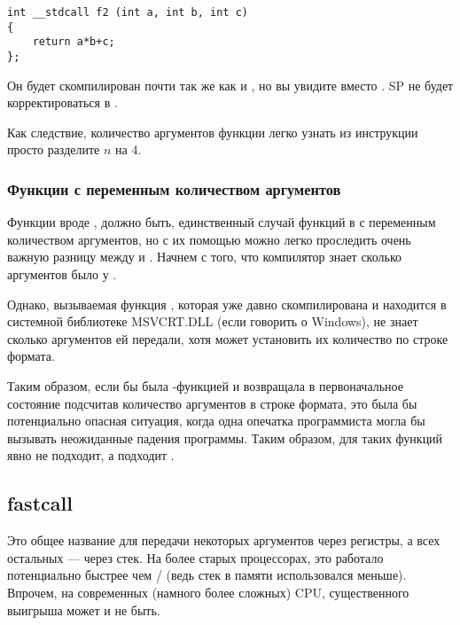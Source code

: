 \begin{lstlisting}
int __stdcall f2 (int a, int b, int c)
{
	return a*b+c;
};
\end{lstlisting}

Он будет скомпилирован почти так же как и ,
но вы увидите  вместо . 
\ac{SP} не будет корректироваться в .

Как следствие, количество аргументов функции легко узнать из инструкции  просто разделите
$n$ на 4.



\subsubsection{Функции с переменным количеством аргументов}

Функции вроде \printf, должно быть, единственный случай функций в \CCpp с переменным количеством аргументов,
но с их помощью можно легко проследить очень важную разницу между  и .
Начнем с того, что компилятор знает сколько аргументов было у \printf.

Однако, вызываемая функция \printf, которая уже давно скомпилирована 
и находится в системной библиотеке MSVCRT.DLL (если говорить о Windows), 
не знает сколько аргументов ей передали, хотя может установить их количество по строке формата.

Таким образом, если бы \printf была -функцией и возвращала  в первоначальное состояние 
подсчитав количество аргументов в строке формата, это была бы потенциально опасная ситуация, 
когда одна опечатка программиста могла бы вызывать неожиданные падения программы. 
Таким образом, для таких функций  явно не подходит, а подходит .

\subsection{fastcall}
\label{fastcall}

Это общее название для передачи некоторых аргументов через регистры, а всех остальных --- через стек.
На более старых процессорах, это работало потенциально быстрее чем / (ведь стек в памяти использовался меньше).
Впрочем, на современных (намного более сложных) CPU, существенного выигрыша может и не быть.


